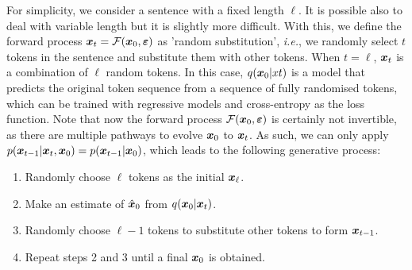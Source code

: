 For simplicity, we consider a sentence with a fixed length $\ell$. It is possible also to deal with variable length but it is slightly more difficult. With this, we define the forward process $\bm{x}_{t}=\mathcal{F}(\bm{x}_0,\bm{\varepsilon})$ as 'random substitution', \emph{i.e.}, we randomly select $t$ tokens in the sentence and substitute them with other tokens. When $t=\ell$, $\bm{x}_{t}$ is a combination of $\ell$ random tokens. In this case, $q(\bm{x}_0|xt)$ is a model that predicts the original token sequence from a sequence of fully randomised tokens, which can be trained with regressive models and cross-entropy as the loss function. Note that now the forward process  $\mathcal{F}(\bm{x}_0,\bm{\varepsilon})$  is certainly not invertible, as there are multiple pathways to evolve $\bm{x}_0$ to $\bm{x}_{t}$. As such, we can only apply $p(\bm{x}_{t-1}|\bm{x}_{t},\bm{x}_0)=p(\bm{x}_{t-1}|\bm{x}_0)$, which leads to the following generative process:
\begin{myquote}
    \begin{enumerate}
        \item Randomly choose $\ell$ tokens as the initial $\bm{x}_\ell$.
        \item Make an estimate of $\hat{\bm{x}}_0$ from $q(\bm{x}_0|\bm{x}_{t})$.
        \item Randomly choose $\ell-1$ tokens to substitute other tokens to form $\bm{x}_{t-1}$.
        \item Repeat steps 2 and 3 until a final $\bm{x}_0$ is obtained.
    \end{enumerate}
\end{myquote}

